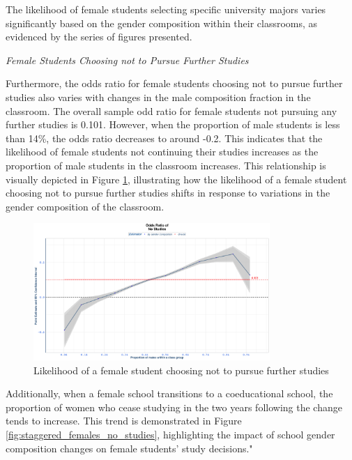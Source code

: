 
The likelihood of female students selecting specific university majors varies significantly based on the gender composition within their classrooms, as evidenced by the series of figures presented.

\vspace{5mm}
\textit{Female Students Choosing  not to Pursue Further Studies}
\vspace{5mm}

Furthermore, the odds ratio for female students choosing not to pursue further studies also varies with changes in the male composition fraction in the classroom. The overall sample odd ratio for female students not pursuing any further studies is 0.101. However, when the proportion of male students is less than 14\%, the odds ratio decreases to around -0.2. This indicates that the likelihood of female students not continuing their studies increases as the proportion of male students in the classroom increases. This relationship is visually depicted in Figure \ref{fig:no_studies}, illustrating how the likelihood of a female student choosing not to pursue further studies shifts in response to variations in the gender composition of the classroom. 



\begin{figure}[H]
\centering
\includegraphics[width=0.8\textwidth]{Graph/Results/fe_panel_student_gender_composition_wome_in_NO_STUDIES_bce.png}
\caption{Likelihood of a female student choosing not to pursue further studies}
\label{fig:no_studies}
\end{figure}

Additionally, when a female school transitions to a coeducational school, the proportion of women who cease studying in the two years following the change tends to increase. This trend is demonstrated in Figure \ref{fig:staggered_females_no_studies}, highlighting the impact of school gender composition changes on female students' study decisions."

